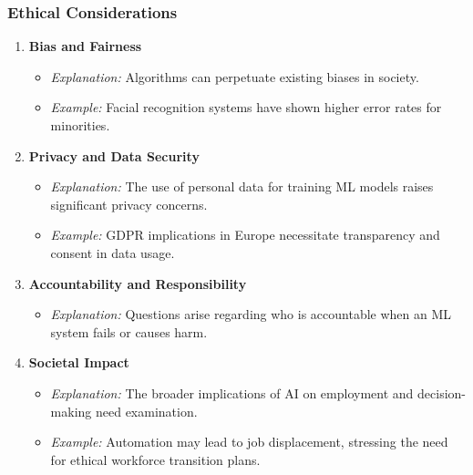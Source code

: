 \documentclass[aspectratio=169]{beamer}
\begin{document}
\begin{frame}[fragile]
    \frametitle{Ethical Considerations}
    \begin{enumerate}
        \item \textbf{Bias and Fairness}
        \begin{itemize}
            \item \textit{Explanation:} Algorithms can perpetuate existing biases in society.
            \item \textit{Example:} Facial recognition systems have shown higher error rates for minorities.
        \end{itemize}

        \item \textbf{Privacy and Data Security}
        \begin{itemize}
            \item \textit{Explanation:} The use of personal data for training ML models raises significant privacy concerns.
            \item \textit{Example:} GDPR implications in Europe necessitate transparency and consent in data usage.
        \end{itemize}
        
        \item \textbf{Accountability and Responsibility}
        \begin{itemize}
            \item \textit{Explanation:} Questions arise regarding who is accountable when an ML system fails or causes harm.
        \end{itemize}

        \item \textbf{Societal Impact}
        \begin{itemize}
            \item \textit{Explanation:} The broader implications of AI on employment and decision-making need examination.
            \item \textit{Example:} Automation may lead to job displacement, stressing the need for ethical workforce transition plans.
        \end{itemize}
    \end{enumerate}
\end{frame}
\end{document}
